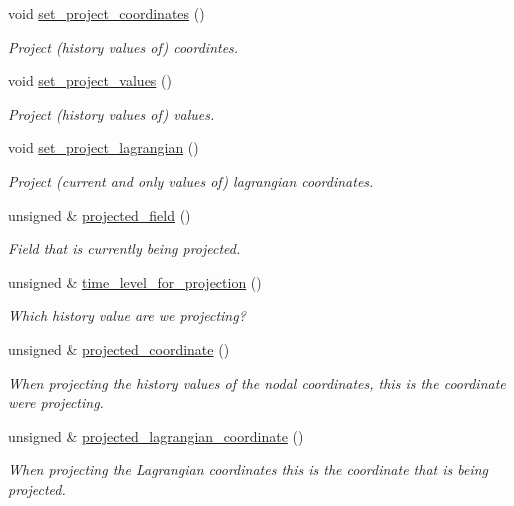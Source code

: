 \begin{DoxyCompactItemize}
void \hyperlink{classoomph_1_1ProjectableElement_ada702d9b155574b33a31c3693f268887}{set\+\_\+project\+\_\+coordinates} ()
\begin{DoxyCompactList}\small\item\em Project (history values of) coordintes. \end{DoxyCompactList}\item 
void \hyperlink{classoomph_1_1ProjectableElement_a51fefa06ef9dc90ea400a0fa1711c232}{set\+\_\+project\+\_\+values} ()
\begin{DoxyCompactList}\small\item\em Project (history values of) values. \end{DoxyCompactList}\item 
void \hyperlink{classoomph_1_1ProjectableElement_ae1a46981a1ca1b4f9f1ef1783a168cf4}{set\+\_\+project\+\_\+lagrangian} ()
\begin{DoxyCompactList}\small\item\em Project (current and only values of) lagrangian coordinates. \end{DoxyCompactList}\item 
unsigned \& \hyperlink{classoomph_1_1ProjectableElement_a1d5640979b055e358f10c5a4b8cfb3b3}{projected\+\_\+field} ()
\begin{DoxyCompactList}\small\item\em Field that is currently being projected. \end{DoxyCompactList}\item 
unsigned \& \hyperlink{classoomph_1_1ProjectableElement_adabcd890a2193f3369dd8e1272f27f5b}{time\+\_\+level\+\_\+for\+\_\+projection} ()
\begin{DoxyCompactList}\small\item\em Which history value are we projecting? \end{DoxyCompactList}\item 
unsigned \& \hyperlink{classoomph_1_1ProjectableElement_a4b63733bc82062bf26be9ea0d18a7c08}{projected\+\_\+coordinate} ()
\begin{DoxyCompactList}\small\item\em When projecting the history values of the nodal coordinates, this is the coordinate we\textquotesingle{}re projecting. \end{DoxyCompactList}\item 
unsigned \& \hyperlink{classoomph_1_1ProjectableElement_a8ee3e91f6fdedeb5e6979e162437b2be}{projected\+\_\+lagrangian\+\_\+coordinate} ()
\begin{DoxyCompactList}\small\item\em When projecting the Lagrangian coordinates this is the coordinate that is being projected. \end{DoxyCompactList}\end{DoxyCompactItemize}
